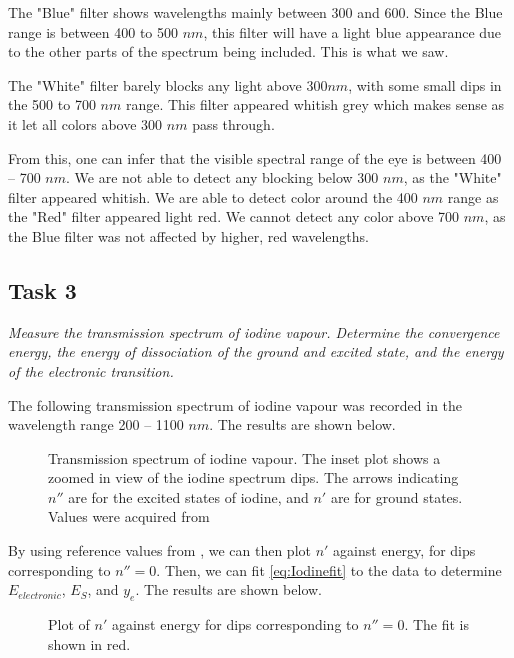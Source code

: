 \documentclass{article}
\begin{document}
The "Blue" filter shows wavelengths mainly between 300 and 600. Since the Blue range is between 400 to 500 $nm$, this filter will have a light blue appearance due to the other parts of the spectrum being included. This is what we saw.

The "White" filter barely blocks any light above 300$nm$, with some small dips in the 500 to 700 $nm$ range. This filter appeared whitish grey which makes sense as it let all colors above 300 $nm$ pass through.

From this, one can infer that the visible spectral range of the eye is between 400 -- 700 $nm$. We are not able to detect any blocking below 300 $nm$, as the "White" filter appeared whitish. We are able to detect color around the 400 $nm$ range as the "Red" filter appeared light red. We cannot detect any color above 700 $nm$, as the Blue filter was not affected by higher, red wavelengths. 

\pagebreak{}

\subsection{Task 3}

\textit{Measure the transmission spectrum of iodine vapour. Determine the convergence
energy, the energy of dissociation of the ground and excited state, and the energy
of the electronic transition.}

The following transmission spectrum of iodine vapour was recorded in the wavelength range 200 -- 1100 $nm$. The results are shown below.

\begin{figure}[h!]
	\centering
	\scalebox{0.75}{}
	\caption{Transmission spectrum of iodine vapour. The inset plot shows a zoomed in view of the iodine spectrum dips. The arrows indicating $n''$ are for the excited states of iodine, and $n'$ are for ground states. Values were acquired from \cite{King2010AbsorptionAF}}
	\label{fig:Iodine}
\end{figure}

By using reference values from \cite{King2010AbsorptionAF}, we can then plot $n'$ against energy, for dips corresponding to $n''=0$. Then, we can fit \ref{eq:Iodinefit} to the data to determine $E_{electronic}$, $E_S$, and $y_e$. The results are shown below.

\begin{figure}[h!]
	\centering
	\scalebox{0.75}{}
	\caption{Plot of $n'$ against energy for dips corresponding to $n''=0$. The fit is shown in red.}
	\label{fig:IodineFit}
\end{figure}
\end{document}
